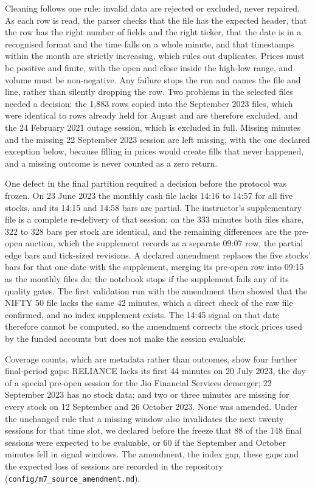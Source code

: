 \documentclass[11pt,a4paper]{article}
\begin{document}
Cleaning follows one rule: invalid data are rejected or excluded, never repaired. As each row is read, the parser checks that the file has the expected header, that the row has the right number of fields and the right ticker, that the date is in a recognised format and the time falls on a whole minute, and that timestamps within the month are strictly increasing, which rules out duplicates. Prices must be positive and finite, with the open and close inside the high-low range, and volume must be non-negative. Any failure stops the run and names the file and line, rather than silently dropping the row. Two problems in the selected files needed a decision: the 1,883 rows copied into the September 2023 files, which were identical to rows already held for August and are therefore excluded, and the 24 February 2021 outage session, which is excluded in full. Missing minutes and the missing 22 September 2023 session are left missing, with the one declared exception below, because filling in prices would create fills that never happened, and a missing outcome is never counted as a zero return.

One defect in the final partition required a decision before the protocol was frozen. On 23 June 2023 the monthly cash file lacks 14:16 to 14:57 for all five stocks, and its 14:15 and 14:58 bars are partial. The instructor's supplementary file is a complete re-delivery of that session: on the 333 minutes both files share, 322 to 328 bars per stock are identical, and the remaining differences are the pre-open auction, which the supplement records as a separate 09:07 row, the partial edge bars and tick-sized revisions. A declared amendment replaces the five stocks' bars for that one date with the supplement, merging its pre-open row into 09:15 as the monthly files do; the notebook stops if the supplement fails any of its quality gates. The first validation run with the amendment then showed that the NIFTY 50 file lacks the same 42 minutes, which a direct check of the raw file confirmed, and no index supplement exists. The 14:45 signal on that date therefore cannot be computed, so the amendment corrects the stock prices used by the funded accounts but does not make the session evaluable.

Coverage counts, which are metadata rather than outcomes, show four further final-period gaps: RELIANCE lacks its first 44 minutes on 20 July 2023, the day of a special pre-open session for the Jio Financial Services demerger; 22 September 2023 has no stock data; and two or three minutes are missing for every stock on 12 September and 26 October 2023. None was amended. Under the unchanged rule that a missing window also invalidates the next twenty sessions for that time slot, we declared before the freeze that 88 of the 148 final sessions were expected to be evaluable, or 60 if the September and October minutes fell in signal windows. The amendment, the index gap, these gaps and the expected loss of sessions are recorded in the repository (\nolinkurl{config/m7_source_amendment.md}).
\end{document}
